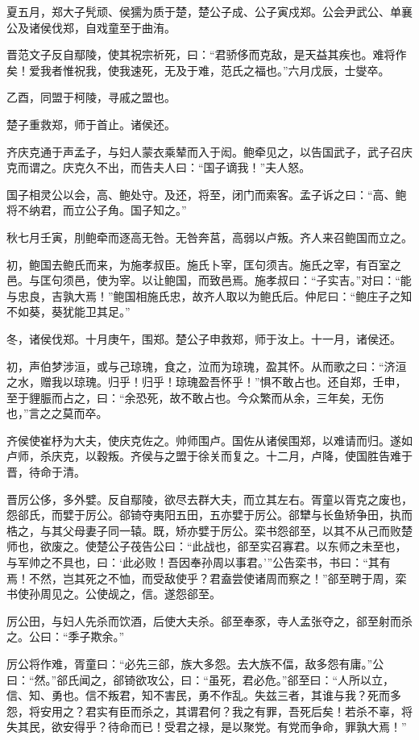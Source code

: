 \documentclass[a4paper,12pt,UTF8,twoside]{ctexbook}
\begin{document}
夏五月，郑大子髠顽、侯獳为质于楚，楚公子成、公子寅戍郑。公会尹武公、单襄公及诸侯伐郑，自戏童至于曲洧。

晋范文子反自鄢陵，使其祝宗祈死，曰：“君骄侈而克敌，是天益其疾也。难将作矣！爱我者惟祝我，使我速死，无及于难，范氏之福也。”六月戊辰，士燮卒。

乙酉，同盟于柯陵，寻戚之盟也。

楚子重救郑，师于首止。诸侯还。

齐庆克通于声孟子，与妇人蒙衣乘辇而入于闳。鲍牵见之，以告国武子，武子召庆克而谓之。庆克久不出，而告夫人曰：“国子谪我！”夫人怒。

国子相灵公以会，高、鲍处守。及还，将至，闭门而索客。孟子诉之曰：“高、鲍将不纳君，而立公子角。国子知之。”

秋七月壬寅，刖鲍牵而逐高无咎。无咎奔莒，高弱以卢叛。齐人来召鲍国而立之。

初，鲍国去鲍氏而来，为施孝叔臣。施氏卜宰，匡句须吉。施氏之宰，有百室之邑。与匡句须邑，使为宰。以让鲍国，而致邑焉。施孝叔曰：“子实吉。”对曰：“能与忠良，吉孰大焉！”鲍国相施氏忠，故齐人取以为鲍氏后。仲尼曰：“鲍庄子之知不如葵，葵犹能卫其足。”

冬，诸侯伐郑。十月庚午，围郑。楚公子申救郑，师于汝上。十一月，诸侯还。

初，声伯梦涉洹，或与己琼瑰，食之，泣而为琼瑰，盈其怀。从而歌之曰：“济洹之水，赠我以琼瑰。归乎！归乎！琼瑰盈吾怀乎！”惧不敢占也。还自郑，壬申，至于貍脤而占之，曰：“余恐死，故不敢占也。今众繁而从余，三年矣，无伤也，”言之之莫而卒。

齐侯使崔杼为大夫，使庆克佐之。帅师围卢。国佐从诸侯围郑，以难请而归。遂如卢师，杀庆克，以穀叛。齐侯与之盟于徐关而复之。十二月，卢降，使国胜告难于晋，待命于清。

晋厉公侈，多外嬖。反自鄢陵，欲尽去群大夫，而立其左右。胥童以胥克之废也，怨郤氏，而嬖于厉公。郤锜夺夷阳五田，五亦嬖于厉公。郤犫与长鱼矫争田，执而梏之，与其父母妻子同一辕。既，矫亦嬖于厉公。栾书怨郤至，以其不从己而败楚师也，欲废之。使楚公子茷告公曰：“此战也，郤至实召寡君。以东师之未至也，与军帅之不具也，曰：‘此必败！吾因奉孙周以事君。’”公告栾书，书曰：“其有焉！不然，岂其死之不恤，而受敌使乎？君盍尝使诸周而察之！”郤至聘于周，栾书使孙周见之。公使觇之，信。遂怨郤至。

厉公田，与妇人先杀而饮酒，后使大夫杀。郤至奉豕，寺人孟张夺之，郤至射而杀之。公曰：“季子欺余。”

厉公将作难，胥童曰：“必先三郤，族大多怨。去大族不偪，敌多怨有庸。”公曰：“然。”郤氏闻之，郤锜欲攻公，曰：“虽死，君必危。”郤至曰：“人所以立，信、知、勇也。信不叛君，知不害民，勇不作乱。失兹三者，其谁与我？死而多怨，将安用之？君实有臣而杀之，其谓君何？我之有罪，吾死后矣！若杀不辜，将失其民，欲安得乎？待命而已！受君之禄，是以聚党。有党而争命，罪孰大焉！”
\end{document}
